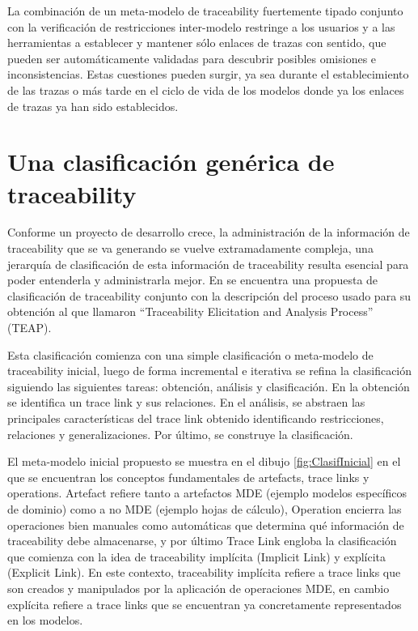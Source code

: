 \documentclass[a4paper,12pt,oneside]{book}
\begin{document}
La combinación de un meta-modelo de traceability fuertemente tipado conjunto con la verificación de restricciones inter-modelo restringe a los usuarios y a las herramientas a establecer y mantener sólo enlaces de trazas con sentido, que pueden ser automáticamente validadas para descubrir posibles omisiones e inconsistencias. Estas cuestiones pueden surgir, ya sea durante el establecimiento de las trazas o más tarde en el ciclo de vida de los modelos donde ya los enlaces de trazas ya han sido establecidos.

\section{Una clasificación genérica de traceability}

Conforme un proyecto de desarrollo crece, la administración de la información de traceability que se va generando se vuelve extramadamente compleja, una jerarquía de clasificación de esta información de traceability resulta esencial para poder entenderla y administrarla mejor. En \cite{PaigeOlsenKolovosZschalerPower} se encuentra una propuesta de clasificación de traceability conjunto con la descripción del proceso usado para su obtención al que llamaron ``Traceability Elicitation and Analysis Process'' (TEAP).

Esta clasificación comienza con una simple clasificación o meta-modelo de traceability inicial, luego de forma incremental e iterativa se refina la clasificación siguiendo las siguientes tareas: obtención, análisis y clasificación. En la obtención se identifica un trace link y sus relaciones. En el análisis, se abstraen las principales características del trace link obtenido identificando restricciones, relaciones y generalizaciones. Por último, se construye la clasificación.

El meta-modelo inicial propuesto se muestra en el dibujo \ref{fig:ClasifInicial} en el que se encuentran los conceptos fundamentales de artefacts, trace links y operations. Artefact refiere tanto a artefactos MDE (ejemplo modelos específicos de dominio) como a no MDE (ejemplo hojas de cálculo), Operation encierra las operaciones bien manuales como automáticas que determina qué información de traceability debe almacenarse, y por último Trace Link engloba la clasificación que comienza con la idea de traceability implícita (Implicit Link) y explícita (Explicit Link). En este contexto, traceability implícita refiere a trace links que son creados y manipulados por la aplicación de operaciones MDE, en cambio explícita refiere a trace links que se encuentran ya concretamente representados en los modelos.
\end{document}
